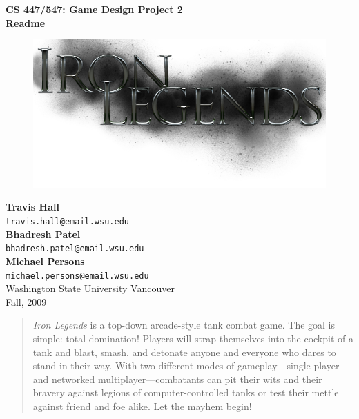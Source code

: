 \documentclass[letterpaper,11pt,twoside]{article}
\begin{document}
\begin{titlepage}
   \begin{center}
       {\large \textbf{CS 447/547: Game Design Project 2}}\\[0.5cm]
       {\large \textbf{Readme}}\\[3.0cm]

        \begin{figure}[htb]
	        \centering
	        \includegraphics[width=\textwidth]{logo.png}
        \end{figure} 

       \textbf{Travis Hall}\\
       \texttt{travis.hall@email.wsu.edu}\\[0.5cm]
       \textbf{Bhadresh Patel}\\
       \texttt{bhadresh.patel@email.wsu.edu}\\[0.5cm]
       \textbf{Michael Persons}\\
       \texttt{michael.persons@email.wsu.edu}\\[0.5cm]

       \vfill
       Washington State University Vancouver\\
       Fall, 2009
   \end{center}
\end{titlepage}

\begin{abstract}
\emph{Iron Legends} is a top-down arcade-style tank combat game. The goal is simple: total domination! Players will strap themselves into the cockpit of a tank and blast, smash, and detonate anyone and everyone who dares to stand in their way. With two different modes of gameplay–--single-player and networked multiplayer--–combatants can pit their wits and their bravery against legions of computer-controlled tanks or test their mettle against friend and foe alike. Let the mayhem begin!
\end{abstract}
\end{document}
